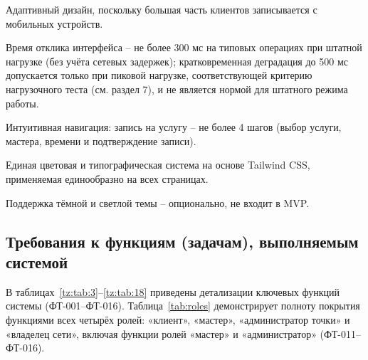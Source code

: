 Адаптивный дизайн, поскольку большая часть клиентов записывается с мобильных устройств.

Время отклика интерфейса -- не более 300 мс на типовых операциях при штатной нагрузке (без учёта сетевых задержек); кратковременная деградация до 500 мс допускается только при пиковой нагрузке, соответствующей критерию нагрузочного теста (см. раздел 7), и не является нормой для штатного режима работы.

Интуитивная навигация: запись на услугу -- не более 4 шагов (выбор услуги, мастера, времени и подтверждение записи).

Единая цветовая и типографическая система на основе Tailwind CSS, применяемая единообразно на всех страницах.

Поддержка тёмной и светлой темы -- опционально, не входит в MVP.

\subsection{Требования к функциям (задачам), выполняемым системой}
\label{sec:functions}
В таблицах~\ref{tz:tab:3}--\ref{tz:tab:18} приведены детализации ключевых функций системы (ФТ-001--ФТ-016). Таблица~\ref{tab:roles} демонстрирует полноту покрытия функциями всех четырёх ролей: «клиент», «мастер», «администратор точки» и «владелец сети», включая функции ролей «мастер» и «администратор» (ФТ-011--ФТ-016).

